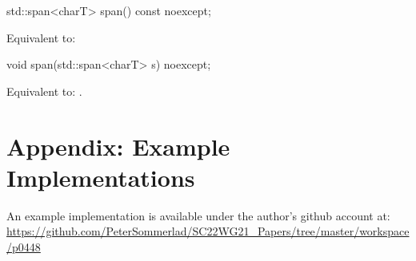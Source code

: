 \documentclass[ebook,11pt,article]{memoir}
\begin{document}
\begin{itemdecl}
std::span<charT> span() const noexcept;
\end{itemdecl}

\begin{itemdescr}
\pnum
\effects Equivalent to: \\
\end{itemdescr}

\begin{itemdecl}
void span(std::span<charT> s) noexcept;
\end{itemdecl}

\begin{itemdescr}
\pnum
\effects
Equivalent to:
.
\end{itemdescr}



\chapter{Appendix: Example Implementations}
An example implementation is available under the author's github account at:
\url{https://github.com/PeterSommerlad/SC22WG21_Papers/tree/master/workspace/p0448}
\end{document}
